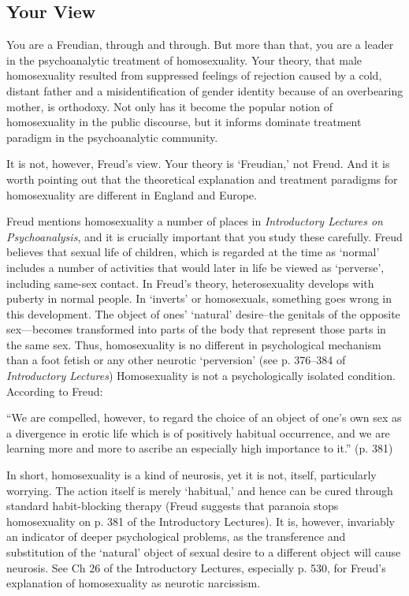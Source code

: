 \begin{refsection}
\section{Your View}
\label{yourview}

You are a Freudian, through and through. But more than that, you are a leader in the psychoanalytic treatment of homosexuality. Your theory, that male homosexuality resulted from suppressed feelings of rejection caused by a cold, distant father and a misidentification of gender identity because of an overbearing mother, is orthodoxy. Not only has it become the popular notion of homosexuality in the public discourse, but it informs dominate treatment paradigm in the psychoanalytic community.

It is not, however, Freud's view. Your theory is `Freudian,' not Freud. And it is worth pointing out that the theoretical explanation and treatment paradigms for homosexuality are different in England and Europe.

Freud mentions homosexuality a number of places in \emph{Introductory Lectures on Psychoanalysis}, and it is crucially important that you study these carefully. Freud believes that sexual life of children, which is regarded at the time as `normal' includes a number of activities that would later in life be viewed as `perverse', including same-sex contact. In Freud's theory, heterosexuality develops with puberty in normal people. In `inverts' or homosexuals, something goes wrong in this development. The object of ones' `natural' desire--the genitals of the opposite sex---becomes transformed into parts of the body that represent those parts in the same sex. Thus, homosexuality is no different in psychological mechanism than a foot fetish or any other neurotic `perversion' (see p. 376--384 of \emph{Introductory Lectures}) Homosexuality is not a psychologically isolated condition. According to Freud:

``We are compelled, however, to regard the choice of an object of one's own sex as a divergence in erotic life which is of positively habitual occurrence, and we are learning more and more to ascribe an especially high importance to it.'' (p. 381)

In short, homosexuality is a kind of neurosis, yet it is not, itself, particularly worrying. The action itself is merely `habitual,' and hence can be cured through standard habit-blocking therapy (Freud suggests that paranoia stops homosexuality on p. 381 of the Introductory Lectures). It is, however, invariably an indicator of deeper psychological problems, as the transference and substitution of the `natural' object of sexual desire to a different object will cause neurosis. See Ch 26 of the Introductory Lectures, especially p. 530, for Freud's explanation of homosexuality as neurotic narcissism.


\end{refsection}
